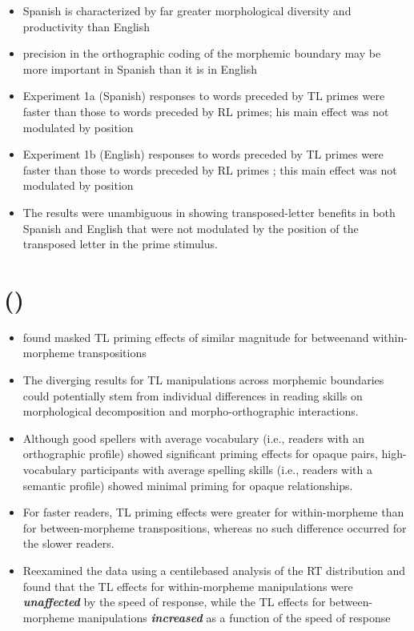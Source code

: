 \documentclass[]{article}
\begin{document}
{\begin{itemize}
		\item Spanish is characterized by far greater morphological diversity and productivity than English
		\item precision in the orthographic coding of the morphemic boundary may be more important in Spanish than it is in English
		\item Experiment 1a (Spanish)  responses to words preceded by TL primes were faster than those to words preceded by RL primes; his main effect was not modulated by position
		\item Experiment 1b (English) responses to words preceded by TL primes were faster than those to words preceded by RL primes ; this main effect was not modulated by position
		\item The results were unambiguous in showing transposed-letter benefits in both Spanish and English that were not modulated by the position of the transposed letter in the prime stimulus.
	\end{itemize}
	
	\section{(\citet*{dunabeitia_revisiting_2014})}
	\begin{itemize}
		\item \citet*{sanchez-gutierrez_letter_2013} found masked TL priming effects of similar magnitude for betweenand within-morpheme transpositions
		\item The diverging results for TL manipulations across morphemic boundaries could potentially stem from individual differences in reading skills on morphological decomposition and morpho-orthographic interactions.
		\item Although good spellers with average vocabulary (i.e., readers with an orthographic profile) showed significant priming effects for opaque pairs, high-vocabulary participants with average spelling skills (i.e., readers with a semantic profile) showed minimal priming for opaque relationships.
		\item For faster readers, TL priming effects were greater for within-morpheme than for between-morpheme transpositions, whereas no such difference occurred for the slower readers.
		\item Reexamined the data using a centilebased analysis of the RT distribution and found that the TL effects for within-morpheme manipulations were \textbf{\textit{unaffected}} by the speed of response, while the TL effects for between-morpheme manipulations \textbf{\textit{increased}} as a function of the speed of response
	\end{itemize}
}
\end{document}

